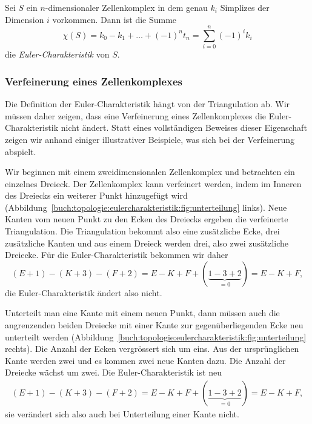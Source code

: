 \begin{definition}
Sei $S$ ein $n$-dimensionaler Zellenkomplex in dem
genau $k_i$ Simplizes der Dimension $i$ vorkommen.
Dann ist die Summe
\[
\chi(S)
=
k_0 - k_1 + \dots + (-1)^n t_n
=
\sum_{i=0}^n (-1)^i k_i
\]
die \emph{Euler-Charakteristik} von $S$.
%
%
\end{definition}

%
%
\subsubsection{Verfeinerung eines Zellenkomplexes}
Die Definition der Euler-Charakteristik hängt von der Triangulation ab.
Wir müssen daher zeigen, dass eine Verfeinerung eines Zellenkomplexes die
Euler-Charakteristik nicht ändert.
Statt eines vollständigen Beweises dieser Eigenschaft zeigen wir anhand
einiger illustrativer Beispiele, was sich bei der Verfeinerung
abspielt.
%

Wir beginnen mit einem zweidimensionalen Zellenkomplex
und betrachten ein einzelnes Dreieck.
Der Zellenkomplex kann verfeinert werden, indem im Inneren des
Dreiecks ein weiterer Punkt hinzugefügt wird
(Abbildung~\ref{buch:topologie:eulercharakteristik:fig:unterteilung} links).
Neue Kanten vom neuen Punkt zu den Ecken des Dreiecks ergeben die
verfeinerte Triangulation.
Die Triangulation bekommt also eine zusätzliche Ecke, drei zusätzliche
Kanten und aus einem Dreieck werden drei, also zwei zusätzliche Dreiecke.
Für die Euler-Charakteristik bekommen wir daher
\[
(E+1) - (K+3) - (F+2)
=
E-K+F+(\underbrace{1-3+2}_{\displaystyle=0})
=
E-K+F,
\]
die Euler-Charakteristik ändert also nicht.

Unterteilt man eine Kante mit einem neuen Punkt, dann müssen auch
die angrenzenden beiden Dreiecke mit einer Kante zur gegenüberliegenden
Ecke neu unterteilt werden
(Abbildung~\ref{buch:topologie:eulercharakteristik:fig:unterteilung} rechts).
Die Anzahl der Ecken vergrössert sich um eins.
Aus der ursprünglichen Kante werden zwei und es kommen zwei neue Kanten
dazu.
Die Anzahl der Dreiecke wächst um zwei.
Die Euler-Charakteristik ist neu
\begin{align*}
(E+1) - (K+3) - (F+2)
=
E-K+F +(\underbrace{1-3+2}_{\displaystyle=0})
=
E-K+F,
\end{align*}
sie verändert sich also auch bei Unterteilung einer Kante nicht.

